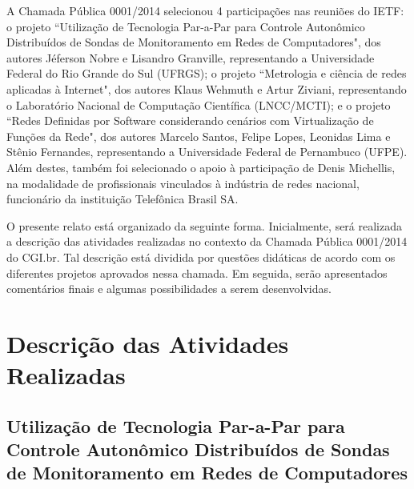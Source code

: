 \documentclass[12pt]{article}
\begin{document}
A Chamada Pública 0001/2014 selecionou 4 participações nas reuniões do IETF: o projeto ``Utilização de Tecnologia Par-a-Par para Controle Autonômico Distribuídos de Sondas de Monitoramento em Redes de Computadores", dos autores Jéferson Nobre e Lisandro Granville, representando a Universidade Federal do Rio Grande do Sul (UFRGS); o projeto ``Metrologia e ciência de redes aplicadas à Internet", dos autores Klaus Wehmuth e Artur Ziviani, representando o Laboratório Nacional de Computação Científica (LNCC/MCTI); e o projeto ``Redes Definidas por Software considerando cenários com Virtualização de Funções da Rede", dos autores Marcelo Santos, Felipe Lopes, Leonidas Lima e Stênio Fernandes, representando a Universidade Federal de Pernambuco (UFPE). Além destes, também foi selecionado o apoio à participação de Denis Michellis, na modalidade de profissionais vinculados à indústria de redes nacional, funcionário da instituição Telefônica Brasil SA.


O presente relato está organizado da seguinte forma. Inicialmente, será realizada a descrição das atividades realizadas no contexto da Chamada Pública 0001/2014 do CGI.br. Tal descrição está dividida por questões didáticas de acordo com os diferentes projetos aprovados nessa chamada. Em seguida, serão apresentados comentários finais e algumas possibilidades a serem desenvolvidas.

\section{Descrição das Atividades Realizadas}

\subsection{Utilização de Tecnologia Par-a-Par para Controle Autonômico Distribuídos de Sondas de Monitoramento em Redes de Computadores}

\end{document}
